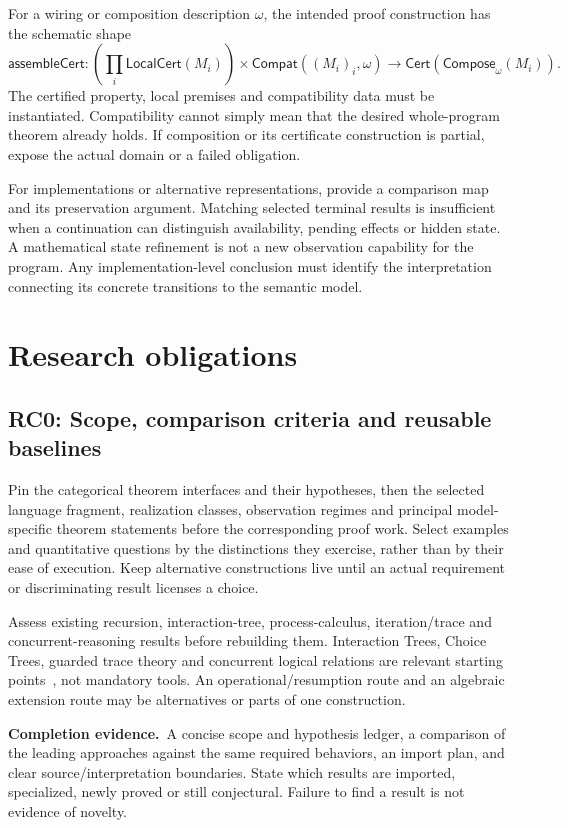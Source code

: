 \documentclass[11pt,a4paper]{article}
\newcommand{\deliver}{\par\textbf{Completion evidence.}\ }
\begin{document}
For a wiring or composition description \(\omega\), the intended proof construction has the schematic shape
\[
\mathsf{assembleCert}:
\left(\prod_i\mathsf{LocalCert}(M_i)\right)
\times\mathsf{Compat}((M_i)_i,\omega)
\longrightarrow
\mathsf{Cert}\!\left(\mathsf{Compose}_{\omega}(M_i)\right).
\]
The certified property, local premises and compatibility data must be instantiated. Compatibility cannot simply mean that the desired whole-program theorem already holds. If composition or its certificate construction is partial, expose the actual domain or a failed obligation.

For implementations or alternative representations, provide a comparison map and its preservation argument. Matching selected terminal results is insufficient when a continuation can distinguish availability, pending effects or hidden state. A mathematical state refinement is not a new observation capability for the program. Any implementation-level conclusion must identify the interpretation connecting its concrete transitions to the semantic model.

\section{Research obligations}\label{sec:obligations}

\subsection*{RC0: Scope, comparison criteria and reusable baselines}\label{rc0}
Pin the categorical theorem interfaces and their hypotheses, then the selected language fragment, realization classes, observation regimes and principal model-specific theorem statements before the corresponding proof work. Select examples and quantitative questions by the distinctions they exercise, rather than by their ease of execution. Keep alternative constructions live until an actual requirement or discriminating result licenses a choice.

Assess existing recursion, interaction-tree, process-calculus, iteration/trace and concurrent-reasoning results before rebuilding them. Interaction Trees, Choice Trees, guarded trace theory and concurrent logical relations are relevant starting points~\cite{itrees,ctrees,guarded,reloc}, not mandatory tools. An operational/resumption route and an algebraic extension route may be alternatives or parts of one construction.

\deliver A concise scope and hypothesis ledger, a comparison of the leading approaches against the same required behaviors, an import plan, and clear source/interpretation boundaries. State which results are imported, specialized, newly proved or still conjectural. Failure to find a result is not evidence of novelty.
\end{document}
